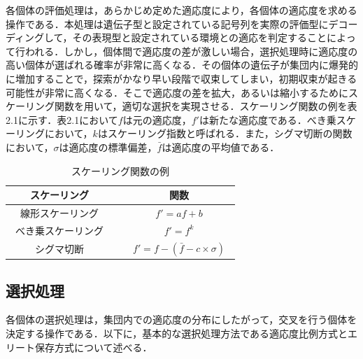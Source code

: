 各個体の評価処理は，あらかじめ定めた適応度により，各個体の適応度を求める操作である．本処理は遺伝子型と設定されている記号列を実際の評価型にデコーディングして，その表現型と設定されている環境との適応を判定することによって行われる．しかし，個体間で適応度の差が激しい場合，選択処理時に適応度の高い個体が選ばれる確率が非常に高くなる．その個体の遺伝子が集団内に爆発的に増加することで，探索がかなり早い段階で収束してしまい，初期収束が起きる可能性が非常に高くなる．そこで適応度の差を拡大，あるいは縮小するためにスケーリング関数を用いて，適切な選択を実現させる．スケーリング関数の例を表2.1に示す．表2.1において$f$は元の適応度，$f'$は新たな適応度である．べき乗スケーリングにおいて，$k$はスケーリング指数と呼ばれる．また，シグマ切断の関数において，$\sigma$は適応度の標準偏差，$\bar{f}$は適応度の平均値である．



\begin{table}[!ht]
\caption{スケーリング関数の例}
\label{tb:sk}
\begin{center}
\begin{tabular}{|c||c|}\hline
スケーリング　&　関数　\\ \hline
線形スケーリング　&　$f'=af+b$　\\ \hline
べき乗スケーリング　&　$f'=f^{k}$　\\ \hline
シグマ切断　&　$f'=f-( \bar{f} - c \times \sigma )$　\\ \hline
\end{tabular}
\end{center}
\end{table}

\newpage


\subsection{選択処理}
\label{sec2.1.3}

各個体の選択処理は，集団内での適応度の分布にしたがって，交叉を行う個体を決定する操作である．以下に，基本的な選択処理方法である適応度比例方式とエリート保存方式について述べる．

